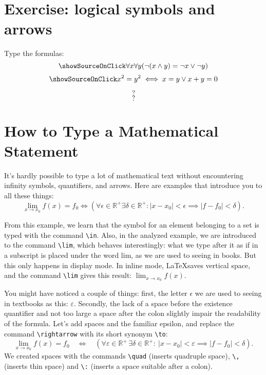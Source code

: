 \section{Exercise: logical symbols and arrows}
\begin{staticpart}
Type the formulas: \[\showSourceOnClick  \forall x\forall y(\lnot (x\land y)=\lnot x\lor \lnot y) \] \[\showSourceOnClick  x^2 = y^2 \iff x=y \lor x+y=0 \]
\end{staticpart}
\[ ? \]
\[ ? \]

\section{How to Type a Mathematical Statement}
\par It's hardly possible to type a lot of mathematical text without encountering infinity symbols, quantifiers, and arrows. Here are examples that introduce you to all these things:
\[\lim_{x\rightarrow x_0}f(x)=f_0 \iff ( \forall \epsilon\in\mathbb{R}^+ \exists \delta\in\mathbb{R}^+: |x-x_0|<\epsilon \implies |f-f_0|<\delta ). \]
\par From this example, we learn that the symbol for an element belonging to a set is typed with the command \verb"\in". Also, in the analyzed example, we are introduced to the command \verb"\lim"\index{\lim}, which behaves interestingly: what we type after it as if in a subscript is placed under the word lim, as we are used to seeing in books. But this only happens in display mode. In inline mode, \LaTeX saves vertical space, and the command \verb"\lim" gives this result: \( \lim_{x\rightarrow x_0}f(x) \).
\par You might have noticed a couple of things: first, the letter \( \epsilon \) we are used to seeing in textbooks as this: \( \varepsilon \). Secondly, the lack of a space before the existence quantifier and not too large a space after the colon slightly impair the readability of the formula. Let's add spaces and the familiar epsilon, and replace the command \verb"\rightarrow" with its short synonym \verb"\to":
\[\lim_{x\to x_0}f(x)=f_0\quad \iff\quad ( \forall \varepsilon\in\mathbb{R}^+ \, \exists \delta\in\mathbb{R}^+:\: |x-x_0|<\varepsilon \implies |f-f_0|<\delta ). \]
We created spaces with the commands \verb"\quad" (inserts quadruple space), \verb"\," (inserts thin space) and \verb"\:" (inserts a space suitable after a colon).

